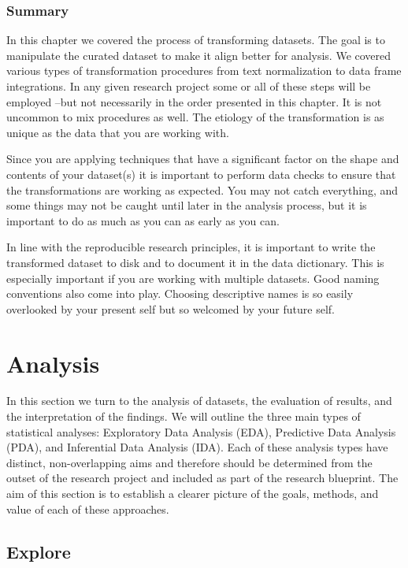 \documentclass[
  letterpaper,
]{latex/krantz}
\theoremstyle{definition}
\theoremstyle{remark}
\begin{document}
\section*{Summary}\label{summary-6}


In this chapter we covered the process of transforming datasets. The
goal is to manipulate the curated dataset to make it align better for
analysis. We covered various types of transformation procedures from
text normalization to data frame integrations. In any given research
project some or all of these steps will be employed --but not
necessarily in the order presented in this chapter. It is not uncommon
to mix procedures as well. The etiology of the transformation is as
unique as the data that you are working with.

Since you are applying techniques that have a significant factor on the
shape and contents of your dataset(s) it is important to perform data
checks to ensure that the transformations are working as expected. You
may not catch everything, and some things may not be caught until later
in the analysis process, but it is important to do as much as you can as
early as you can.

In line with the reproducible research principles, it is important to
write the transformed dataset to disk and to document it in the data
dictionary. This is especially important if you are working with
multiple datasets. Good naming conventions also come into play. Choosing
descriptive names is so easily overlooked by your present self but so
welcomed by your future self.

\part{Analysis}

In this section we turn to the analysis of datasets, the evaluation of
results, and the interpretation of the findings. We will outline the
three main types of statistical analyses: Exploratory Data Analysis
(EDA), Predictive Data Analysis (PDA), and Inferential Data Analysis
(IDA). Each of these analysis types have distinct, non-overlapping aims
and therefore should be determined from the outset of the research
project and included as part of the research blueprint. The aim of this
section is to establish a clearer picture of the goals, methods, and
value of each of these approaches.

\chapter{Explore}\label{sec-explore-chapter}
\end{document}
